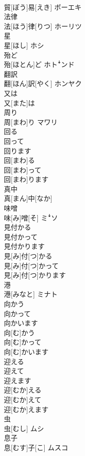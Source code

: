 \documentclass[8pt]{extreport}
\begin{document}
\begin{CJK}{UTF8}{min}
\\	貿[ぼう]易[えき]	ボーエキ
\\	法律	
\\	法[ほう]律[りつ]	ホーリツ
\\	星	
\\	星[ほし]	ホシ
\\	殆ど	
\\	殆[ほとん]ど	ホトꜜンド
\\	翻訳	
\\	翻[ほん]訳[やく]	ホンヤク
\\	又は	
\\	又[また]は	
\\	周り	
\\	周[まわ]り	マワリ
\\	回る 
\\	回って 
\\	回ります	
\\	回[まわ]る 
\\	回[まわ]って 
\\	回[まわ]ります	
\\	真中	
\\	真[まん]中[なか]	
\\	味噌	
\\	味[み]噌[そ]	ミꜜソ
\\	見付かる 
\\	見付かって 
\\	見付かります	
\\	見[み]付[つ]かる 
\\	見[み]付[つ]かって 
\\	見[み]付[つ]かります	
\\	港	
\\	港[みなと]	ミナト
\\	向かう 
\\	向かって 
\\	向かいます	
\\	向[む]かう 
\\	向[む]かって 
\\	向[む]かいます	
\\	迎える 
\\	迎えて 
\\	迎えます	
\\	迎[むか]える 
\\	迎[むか]えて 
\\	迎[むか]えます	
\\	虫	
\\	虫[むし]	ムシ
\\	息子	
\\	息[むす]子[こ]	ムスコ

\end{CJK}
\end{document}
